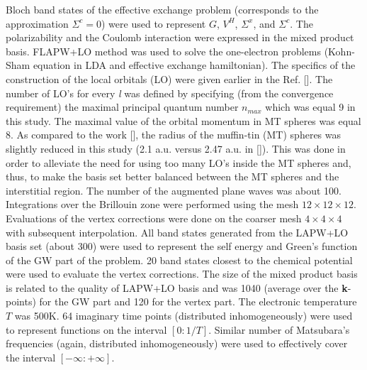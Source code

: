 \documentclass[aps,prb,floatfix,epsfig,twocolumn,preprintnumbers]{revtex4}
\begin{document}
Bloch band states of the effective exchange problem\cite{prb_85_155129} (corresponds to the approximation $\Sigma^{c}=0$) were used to represent $G$, $V^{H}$, $\Sigma^{x}$, and $\Sigma^{c}$. The polarizability and the Coulomb interaction were expressed in the mixed product basis.\cite{prb_76_165106,arx_1606_08427} FLAPW+LO method was used to solve the one-electron problems (Kohn-Sham equation in LDA and effective exchange hamiltonian). The specifics of the construction of the local orbitals (LO) were given earlier in the Ref. []. The number of LO's for every \textit{l} was defined by specifying (from the convergence requirement) the maximal principal quantum number $n_{max}$ which was equal 9 in this study. The maximal value of the orbital momentum in MT spheres was equal 8. As compared to the work [], the radius of the muffin-tin (MT) spheres was slightly reduced in this study (2.1 a.u. versus 2.47 a.u. in []). This was done in order to alleviate the need for using too many LO's inside the MT spheres and, thus, to make the basis set better balanced between the MT spheres and the interstitial region. The number of the augmented plane waves was about 100. Integrations over the Brillouin zone were performed using the mesh $12\times 12\times 12$. Evaluations of the vertex corrections were done on the coarser mesh $4\times 4\times 4$ with subsequent interpolation. All band states generated from the LAPW+LO basis set (about 300) were used to represent the self energy and Green's function of the GW part of the problem. 20 band states closest to the chemical potential were used to evaluate the vertex corrections. The size of the mixed product basis is related to the quality of LAPW+LO basis and was 1040 (average over the \textbf{k}-points) for the GW part and 120 for the vertex part. The electronic temperature $T$ was 500K. 64 imaginary time points (distributed inhomogeneously\cite{prb_85_155129}) were used to represent functions on the interval $[0:1/T]$. Similar number of Matsubara's frequencies (again, distributed inhomogeneously) were used to effectively cover the interval $[-\infty:+\infty]$.
\end{document}
